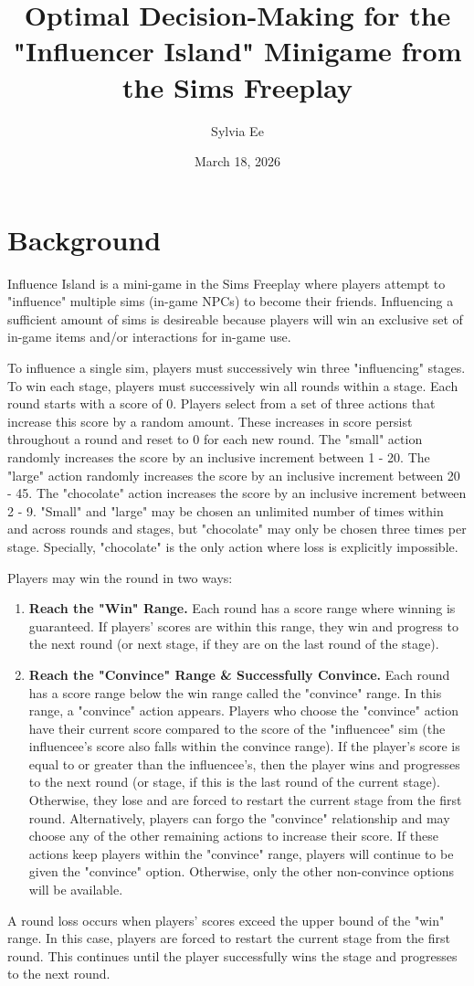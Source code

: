 \documentclass{article}
\title{Optimal Decision-Making for the "Influencer Island" Minigame from the Sims Freeplay}
\author{Sylvia Ee}
\date{March 18, 2026}
\begin{document}
\maketitle

\section{Background}

Influence Island is a mini-game in the Sims Freeplay where players attempt to "influence" multiple sims (in-game NPCs) to become their friends. 
Influencing a sufficient amount of sims is desireable because players will win an exclusive set of in-game items and/or interactions for in-game use.

To influence a single sim, players must successively win three "influencing" stages. To win each stage, players must successively win all rounds within a stage. 
Each round starts with a score of 0. Players select from a set of three actions that increase this score by a random amount. 
These increases in score persist throughout a round and reset to 0 for each new round. 
The "small" action randomly increases the score by an inclusive increment between 1 - 20. The "large" action randomly 
increases the score by an inclusive increment between 20 - 45. The "chocolate" action increases the score by an inclusive 
increment between 2 - 9. "Small" and "large" may be chosen an unlimited number of times within and across rounds and stages,
but "chocolate" may only be chosen three times per stage. Specially, "chocolate" is the only action where loss is explicitly impossible. 

Players may win the round in two ways: 

    \begin{enumerate}
        \item \textbf{Reach the "Win" Range.} Each round has a score range where winning is guaranteed. 
        If players' scores are within this range, they win and progress to the next round (or next stage, if they are on the last round of the stage).
        \item \textbf{Reach the "Convince" Range \& Successfully Convince.} Each round has a score range below the win range called the "convince" range. In this range,
        a "convince" action appears. Players who choose the "convince" action have their current score compared to the score of the "influencee" sim (the influencee's score also falls within the convince range).
        If the player's score is equal to or greater than the influencee's, then the player wins and progresses to the next round (or stage, if this is the last round of the current stage). 
        Otherwise, they lose and are forced to restart the current stage from the first round. Alternatively, players can forgo the "convince" relationship and may choose any of the 
        other remaining actions to increase their score. If these actions keep players within the "convince" range, players will continue to be given the "convince" option. Otherwise, only the other non-convince options will be available.
    \end{enumerate}

A round loss occurs when players' scores exceed the upper bound of the "win" range. In this case, 
players are forced to restart the current stage from the first round. This continues until the player successfully 
wins the stage and progresses to the next round. 
\end{document}
